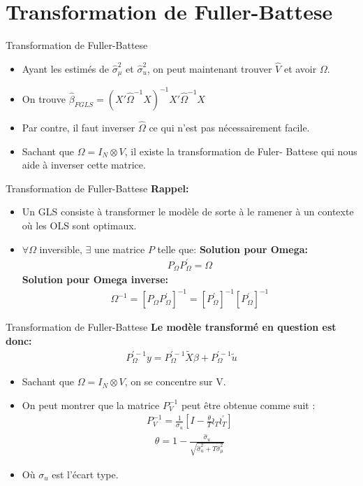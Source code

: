 \documentclass{beamer}
\begin{document}
\section{Transformation de Fuller-Battese}
\frame{\tableofcontents[current]}
\begin{frame}{Transformation de Fuller-Battese}
\begin{itemize}
\item Ayant les estimés de $\hat{\sigma}_{\mu}^2$ et $\hat{\sigma}_{u}^2$, on peut maintenant trouver $\hat{V}$ et avoir $\Omega$.
\item On trouve $\hat{\beta}_{FGLS}=(X'\hat{\Omega}^{-1}X)^{-1}X'\hat{\Omega}^{-1}X$
\item Par contre, il faut inverser $\hat{\Omega}$ ce qui n’est pas nécessairement facile.
\item Sachant que $\Omega=I_N \otimes V$, il existe la transformation de Fuler- Battese qui nous aide à inverser cette matrice.
\end{itemize}
\end{frame}


\begin{frame}{Transformation de Fuller-Battese}
\textbf{Rappel:}
\begin{itemize}
\item  Un GLS consiste à transformer le modèle de sorte à le ramener à un contexte où les OLS sont optimaux. 
\item $\forall \Omega$ inversible, $\exists$ une matrice $P$ telle que:
\textbf{Solution pour Omega:}
\begin{align*}
P_{\Omega}P_{\Omega}^{'}=\Omega
\end{align*} 
\textbf{Solution pour Omega inverse:}
\begin{align*}
\Omega^{-1}=[P_{\Omega}P_{\Omega}^{'}]^{-1}=[P_{\Omega}^{'}]^{-1}[P_{\Omega}^{'}]^{-1}
\end{align*}
\end{itemize}
\end{frame}


\begin{frame}{Transformation de Fuller-Battese}
\textbf{Le modèle transformé en question est donc:}
\begin{align*}
P_{\Omega}^{'-1}y=P_{\Omega}^{'-1} \tilde{X} \beta +  P_{\Omega}^{'-1} \tilde{u}
\end{align*}
\begin{itemize}
\item Sachant que $\Omega=I_N \otimes V$, on se concentre sur V.
\item On peut montrer que la matrice $P_{V}^{-1}$ peut être obtenue comme suit :
\begin{align*}
P_{V}^{-1}=\frac{1}{\sigma_u} \left[I - \frac{\theta}{T}\wr_T \wr_T^{'} \right]
\end{align*}
\begin{align*}
\theta = 1- \frac{\hat{\sigma}_u}{\sqrt{\hat{\sigma}_u^2+T \hat{\sigma}_{\mu}^2}}
\end{align*}
\item Où $\sigma_u$ est l’écart type.
\end{itemize}
\end{frame}
\end{document}
